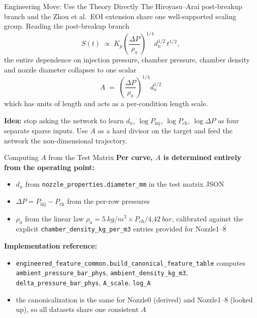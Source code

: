 \documentclass[UTF8,aspectratio=169]{ctexbeamer}
\begin{document}
\begin{frame}{Engineering Move: Use the Theory Directly}
The Hiroyasu--Arai post-breakup branch and the Zhou et al.\ EOI extension share one well-supported scaling group. Reading the post-breakup branch
\[
S(t)\;\propto\;K_p\!\left(\frac{\Delta P}{\rho_a}\right)^{1/4}d_n^{1/2}\,t^{1/2},
\]
the entire dependence on injection pressure, chamber pressure, chamber density and nozzle diameter collapses to one scalar
\[
\boxed{\;A\;=\;\left(\frac{\Delta P}{\rho_a}\right)^{1/4}d_n^{1/2}\;}
\]
which has units of length and acts as a per-condition length scale.

\vspace{0.3em}
\textbf{Idea:} stop asking the network to learn $d_n$, $\log P_{\mathrm{inj}}$, $\log P_{\mathrm{ch}}$, $\log\Delta P$ as four separate sparse inputs. Use $A$ as a hard divisor on the target and feed the network the non-dimensional trajectory.
\end{frame}

\begin{frame}{Computing $A$ from the Test Matrix}
\textbf{Per curve, $A$ is determined entirely from the operating point:}
\begin{itemize}
  \item $d_n$ from \texttt{nozzle\_properties.diameter\_mm} in the test matrix JSON
  \item $\Delta P=P_{\mathrm{inj}}-P_{\mathrm{ch}}$ from the per-row pressures
  \item $\rho_a$ from the linear law $\rho_a=\SI{5}{kg/m^3}\times P_{\mathrm{ch}}/\SI{4.42}{bar}$, calibrated against the explicit \texttt{chamber\_density\_kg\_per\_m3} entries provided for Nozzle1--8
\end{itemize}

\vspace{0.4em}
\textbf{Implementation reference:}
\begin{itemize}
  \item \texttt{engineered\_feature\_common.build\_canonical\_feature\_table} computes \texttt{ambient\_pressure\_bar\_phys}, \texttt{ambient\_density\_kg\_m3}, \texttt{delta\_pressure\_bar\_phys}, \texttt{A\_scale}, \texttt{log\_A}
  \item the canonicalization is the same for Nozzle0 (derived) and Nozzle1--8 (looked up), so all datasets share one consistent $A$
\end{itemize}
\end{frame}
\end{document}
